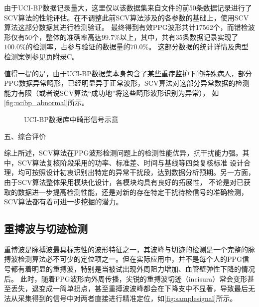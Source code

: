 由于UCI-BP数据记录量大，这里仅以该数据集来自文件的前50条数据记录进行了SCV算法的性能评估。在不调整此前SCV算法涉及的各参数的基础上，使用SCV算法这部分数据其进行检测验证。
最终得到有效PPG波形共计17562个，而错检波形仅有50个，整体的准确率高达$99.7\%$以上，其中，共有35条数据记录实现了$100.0\%$的检测率，占参与验证的数据量的$70.0\%$。
这部分数据的统计详情及典型检测案例参见\pageref{tab:ucibp_details}页附录C。

值得一提的是，由于UCI-BP数据集本身包含了某些重症监护下的特殊病人，部分PPG数据异常畸形，已经明显异于正常波形，SCV算法对这部分异常数据的检测能力有限（或者说SCV算法“成功地”将这些畸形波形识别为异常），
如\autoref{fig:ucibp_abnormal}所示。
\begin{figure}[h]
    \centering
    \quad
    \quad
    \caption{\label{fig:ucibp_abnormal}UCI-BP数据库中畸形信号示意}
\end{figure}

五、综合评价

综上所述，SCV算法在PPG波形检测问题上的检测性能优异，抗干扰能力强。其中，SCV算法复核阶段采用的功率、标准差、时间与基线等四类复核标准
设计合理，均可按照设计初衷识别出特定的异常干扰段，达到数据分析预期。另一方面，由于SCV算法整体采用模块化设计，各模块均具有良好的拓展性，
不论是对已获取的数据进一步提高检测性能，还是对新的存在特定干扰待检信号的准确检测，SCV算法都有着可进一步挖掘的潜力。

\subsection{重搏波与切迹检测}
重博波是脉搏波最具标志性的波形特征之一，其波峰与切迹的检测是一个完整的脉搏波检测算法必不可少的定位项之一\cite{Wang2012}。但在实际应用中，并不是每个人的PPG信号都有着明显的重搏波，特别是当被试出现外周阻力增加、血管壁弹性下降的情况后\cite{mmt}。
此时，随着PPG波形向外周传播，尖锐的重搏波切迹（incisura）常会变形甚至丢失，退变成一简单拐点，甚至重搏波波峰都会在下降支中不显著，导致最后无法从采集得到的信号中对两者直接进行精准定位，如\autoref{fig:samplesignal}所示。

